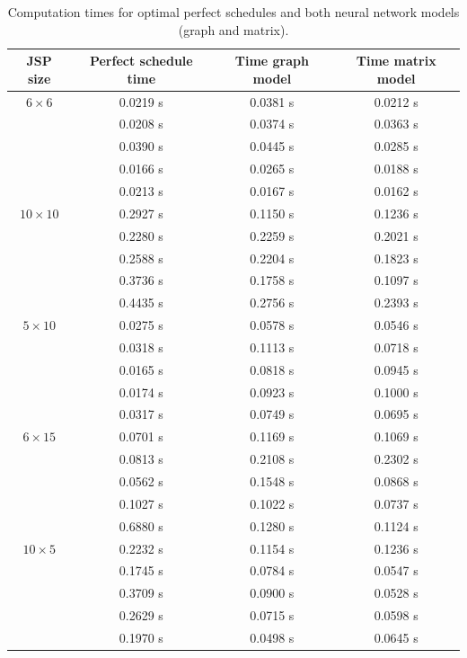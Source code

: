 \documentclass[12pt]{book}
\begin{document}
\begin{table}[htp]
\centering
\begin{tabular}{|c|c|c|c|}
\hline
JSP size & Perfect schedule time & Time graph model & Time matrix model \\
\hline
$6\times6$ & 0.0219 s & 0.0381 s & 0.0212 s \\
\hline
& 0.0208 s & 0.0374 s & 0.0363 s \\
\hline
& 0.0390 s & 0.0445 s & 0.0285 s \\
\hline
& 0.0166 s & 0.0265 s & 0.0188 s \\
\hline
& 0.0213 s & 0.0167 s & 0.0162 s \\
\hline
$10\times10$ & 0.2927 s & 0.1150 s & 0.1236 s \\
\hline
& 0.2280 s & 0.2259 s & 0.2021 s \\
\hline
& 0.2588 s & 0.2204 s & 0.1823 s \\
\hline
& 0.3736 s & 0.1758 s & 0.1097 s \\
\hline
& 0.4435 s & 0.2756 s & 0.2393 s \\
\hline
$5\times10$ & 0.0275 s & 0.0578 s & 0.0546 s \\
\hline
& 0.0318 s & 0.1113 s & 0.0718 s \\
\hline
& 0.0165 s & 0.0818 s & 0.0945 s \\
\hline
& 0.0174 s & 0.0923 s & 0.1000 s \\
\hline
& 0.0317 s & 0.0749 s & 0.0695 s \\
\hline
$6\times15$ & 0.0701 s & 0.1169 s & 0.1069 s \\
\hline
& 0.0813 s & 0.2108 s & 0.2302 s \\
\hline
& 0.0562 s & 0.1548 s & 0.0868 s \\
\hline
& 0.1027 s & 0.1022 s & 0.0737 s \\
\hline
& 0.6880 s & 0.1280 s & 0.1124 s \\
\hline
$10\times5$ & 0.2232 s & 0.1154 s & 0.1236 s \\
\hline
& 0.1745 s & 0.0784 s & 0.0547 s \\
\hline
& 0.3709 s & 0.0900 s & 0.0528 s \\
\hline
& 0.2629 s & 0.0715 s & 0.0598 s \\
\hline
& 0.1970 s & 0.0498 s & 0.0645 s \\
\hline
\end{tabular}
\caption{Computation times for optimal perfect schedules and both neural network models (graph and matrix).}
\label{tab:all_times}
\end{table}
\end{document}
